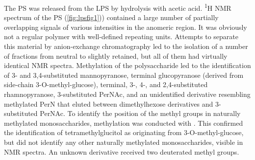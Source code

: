 		The \ac{PS} was released from the \ac{LPS} by hydrolysis with acetic acid. \textsuperscript{1}H \ac{NMR} spectrum of the \ac{PS} (\cref{fig:lpsfig1})) contained a large number of partially overlapping signals of various intensities in the anomeric region. It was obviously not a regular polymer with well-defined repeating units. Attempts to separate this material by anion-exchange chromatography led to the isolation of a number of fractions from neutral to slightly retained, but all of them had virtually identical \ac{NMR} spectra. Methylation of the polysaccharide led to the identification of 3- and 3,4-substituted mannopyranose, terminal glucopyranose (derived from side-chain 3-O-methyl-glucose), terminal, 3-, 4-, and 2,4-substituted rhamnopyranose, 3-substituted PerNAc, and an unidentified derivative resembling methylated PerN that eluted between dimethylhexose derivatives and 3-substituted PerNAc. To identify the position of the methyl groups in naturally methylated monosaccharides, methylation was conducted with . This confirmed the identification of tetramethylglucitol as originating from 3-O-methyl-glucose, but did not identify any other naturally methylated monosaccharides, visible in \ac{NMR} spectra. An unknown derivative received two deuterated methyl groups.

